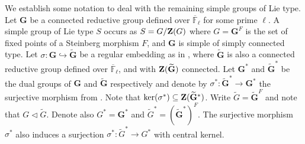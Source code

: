 \documentclass[a4paper,12pt,leqno]{amsart}
\def\zent#1{{\bf Z}(#1)}
\def\nor{\triangleleft}
\def\ker#1{{\rm ker}(#1)}
\def\sbs{\subseteq}
\newcommand{\6}{^}
\theoremstyle{definition}
\theoremstyle{definition}
\theoremstyle{definition}
\theoremstyle{definition}
\theoremstyle{definition}
\begin{document}
We establish some notation to deal with the remaining simple groups of Lie type. Let $\mathbf{G}$ be a connected reductive group defined over $\overline{\mathbb{F}}_\ell$ for some prime $\ell$. A simple group of Lie type $S$ occurs as $S=G/\zent G$ where $G=\mathbf{G}^F$ is the set of fixed points of a Steinberg morphism $F$, and $\mathbf{G}$ is simple of simply connected type. Let $\sigma:\mathbf{G}\hookrightarrow\widetilde{\mathbf{G}}$ be a regular embedding as in \cite[(15.1)]{CabEng}, where $\widetilde{\mathbf{G}}$ is also a connected reductive group defined over $\overline{\mathbb{F}}_\ell$, and with $\zent{\widetilde{\mathbf{G}}}$ connected. Let $\mathbf{G}^*$ and $\widetilde{\mathbf{G}}^*$ be the dual groups of $\mathbf{G}$ and $\widetilde{\mathbf{G}}$ respectively and denote by $\sigma^*:\widetilde{\mathbf{G}}^*\rightarrow\mathbf{G}^*$ the surjective morphism from \cite[(15.1*)]{CabEng}. Note that $\ker{\sigma^*}\sbs\zent{\widetilde{\mathbf{G}}^*}$. Write $\widetilde{G}=\widetilde{\mathbf{G}}^F$ and note that $G\nor \widetilde{G}$. Denote also $G^*=\mathbf{G}^*$ and $\widetilde{G}^*=(\widetilde{\mathbf{G}}^*)^F$. The surjective morphism $\sigma^*$ also induces a surjection $\sigma^*:\widetilde{G}^*\rightarrow G^*$ with central kernel.
\end{document}
